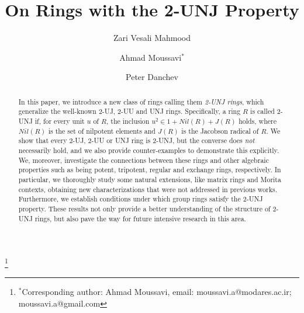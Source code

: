\documentclass[12pt]{amsart}
\theoremstyle{definition}
\begin{document}
	
\author[Z. Vesali Mahmood]{Zari Vesali Mahmood}
\address{Department of Mathematics, Tarbiat Modares University, 14115-111 Tehran Jalal AleAhmad Nasr, Iran}

\author[A. Moussavi]{Ahmad Moussavi$^*$}
\address{Department of Mathematics, Tarbiat Modares University, 14115-111 Tehran Jalal AleAhmad Nasr, Iran}

\thanks{$^*$Corresponding author: Ahmad Moussavi, email: moussavi.a@modares.ac.ir; moussavi.a@gmail.com}

\author[P. Danchev]{Peter Danchev}
\address{Institute of Mathematics and Informatics, Bulgarian Academy of Sciences, 1113 Sofia, Bulgaria}

\title[2-$UNJ$ rings]{On Rings with the 2-UNJ Property}

\maketitle




\begin{abstract}
In this paper, we introduce a new class of rings calling them {\it 2-UNJ rings}, which generalize the well-known 2-UJ, 2-UU and UNJ rings. Specifically, a ring $R$ is called 2-UNJ if, for every unit $u$ of $R$, the inclusion                                                                                                                                                                                                                                                                                                                                                                $u^2 \in 1 + Nil(R) + J(R)$ holds, where $Nil(R)$ is the set of nilpotent elements and $J(R)$ is the Jacobson radical of $R$. We show that every 2-UJ, 2-UU or UNJ ring is 2-UNJ, but the converse does {\it not} necessarily hold, and we also provide counter-examples to demonstrate this explicitly. We, moreover, investigate the connections between these rings and other algebraic properties such as being potent, tripotent, regular and exchange rings, respectively. In particular, we thoroughly study some natural extensions, like matrix rings and Morita contexts, obtaining new characterizations that were not addressed in previous works. Furthermore, we establish conditions under which group rings satisfy the 2-UNJ property. These results not only provide a better understanding of the structure of 2-UNJ rings, but also pave the way for future intensive research in this area.
\end{abstract}
\end{document}
